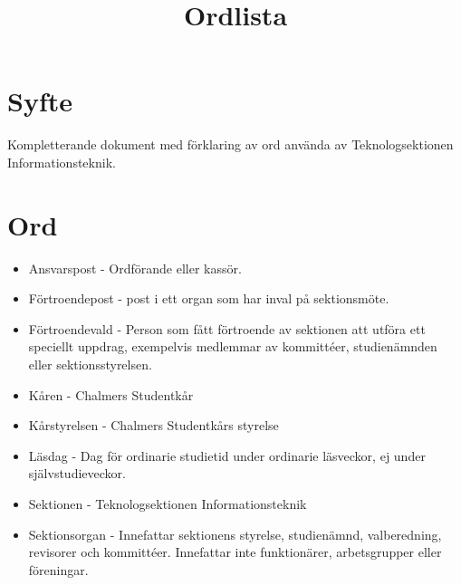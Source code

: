 \documentclass[11pt, includeaddress]{classes/cthit}
\begin{document}
\title{Ordlista}
\maketitle

\thispagestyle{empty}

\newpage

\makeheadfoot%

\setcounter{tocdepth}{2}
\setcounter{page}{1}

\section{Syfte}
Kompletterande dokument med förklaring av ord använda av Teknologsektionen Informationsteknik.

\section{Ord}
\begin{itemize}
	\item Ansvarspost - Ordförande eller kassör.
	\item Förtroendepost - post i ett organ som har inval på sektionsmöte.
	\item Förtroendevald - Person som fått förtroende av sektionen att utföra ett speciellt uppdrag, exempelvis medlemmar av kommittéer, studienämnden eller sektionsstyrelsen.
	\item Kåren - Chalmers Studentkår
	\item Kårstyrelsen - Chalmers Studentkårs styrelse
	\item Läsdag - Dag för ordinarie studietid under ordinarie läsveckor, ej under självstudieveckor.
	\item Sektionen - Teknologsektionen Informationsteknik
	\item Sektionsorgan - Innefattar sektionens styrelse, studienämnd, valberedning, revisorer och kommittéer. Innefattar inte funktionärer, arbetsgrupper eller föreningar.
\end{itemize}
\end{document}
